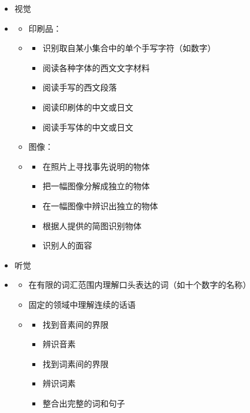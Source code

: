 \documentclass[
  12pt,
  twoside,
  openright,
  oldfontcommands,
]{memoir}
\providecommand{\tightlist}{%
  \setlength{\itemsep}{0pt}\setlength{\parskip}{0pt}}
\begin{document}
\begin{itemize}
\begin{itemize}
  \tightlist
  \item
    符号积分
  \item
    代数式化简
  \item
    无穷级数求和
  \end{itemize}
\item
  视觉
\item
  \begin{itemize}
  \tightlist
  \item
    印刷品：
  \item
    \begin{itemize}
    \tightlist
    \item
      识别取自某小集合中的单个手写字符（如数字）
    \item
      阅读各种字体的西文文字材料
    \item
      阅读手写的西文段落
    \item
      阅读印刷体的中文或日文
    \item
      阅读手写体的中文或日文
    \end{itemize}
  \item
    图像：
  \item
    \begin{itemize}
    \tightlist
    \item
      在照片上寻找事先说明的物体
    \item
      把一幅图像分解成独立的物体
    \item
      在一幅图像中辨识出独立的物体
    \item
      根据人提供的简图识别物体
    \item
      识别人的面容
    \end{itemize}
  \end{itemize}
\item
  听觉
\item
  \begin{itemize}
  \tightlist
  \item
    在有限的词汇范围内理解口头表达的词（如十个数字的名称）
  \item
    固定的领域中理解连续的话语
  \item
    \begin{itemize}
    \tightlist
    \item
      找到音素间的界限
    \item
      辨识音素
    \item
      找到词素间的界限
    \item
      辨识词素
    \item
      整合出完整的词和句子

\end{itemize}
\end{itemize}
\end{itemize}
\end{document}
